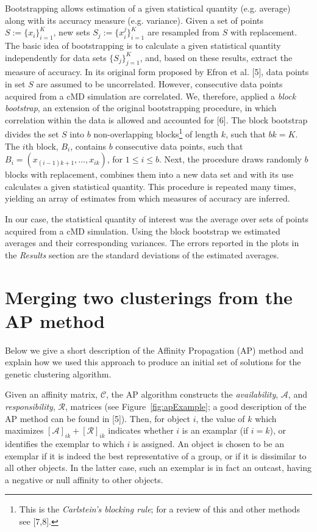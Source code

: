 \documentclass[a4paper,11pt,twoside]{book}%
\begin{document}
\begin{appendices}
Bootstrapping allows estimation of a given statistical quantity (e.g. average) along with its accuracy measure (e.g. variance).
Given a set of points \mbox{$S:=\{ x_i \}_{i=1}^K$}, new sets \mbox{$S_j:=\{ x_i^j \}_{i=1}^{K}$} are resampled from $S$ with replacement.
The basic idea of bootstrapping is to calculate a given statistical quantity independently for data sets $\{ S_j \}_{j=1}^K$, and, based on these results, extract the measure of accuracy. 
In its original form proposed by Efron et al. [5], data points in set $S$ are assumed to be uncorrelated.
However, consecutive data points acquired from a cMD simulation are correlated.
We, therefore, applied a \emph{block bootstrap}, an extension of the original bootstrapping procedure, in which correlation within the data is allowed and accounted for [6].
The block bootstrap divides the set $S$ into $b$ non-overlapping blocks\footnote{This is the \emph{Carlstein's blocking rule}; for a review of this and other methods see [7,8].} of length $k$, such that $bk=K$. 
The $i$th block, $B_i$, contains $b$ consecutive data points, such that $B_i=( x_{(i-1)k+1},\ldots,x_{ik} )$, for $1\leq i\leq b$.
Next, the procedure draws randomly $b$ blocks with replacement, combines them into a new data set and with its use calculates a given statistical quantity.
This procedure is repeated many times, yielding an array of estimates from which measures of accuracy are inferred.

In our case, the statistical quantity of interest was the average over sets of points acquired from a cMD simulation.
Using the block bootstrap we estimated averages and their corresponding variances.
The errors reported in the plots in the \emph{Results} section are the standard deviations of the estimated averages.


\section{Merging two clusterings from the AP method}\label{sec:appendixB}
Below we give a short description of the Affinity Propagation (AP) method and explain how we used this approach to produce an initial set of solutions for the genetic clustering algorithm.

Given an affinity matrix, $\mathcal{C}$, the AP algorithm constructs the \emph{availability}, $\mathcal{A}$, and \emph{responsibility}, $\mathcal{R}$, matrices (see Figure~\ref{fig:apExample}; a good description of the AP method can be found in [5]).
Then, for object $i$, the value of $k$ which maximizes $[\mathcal{A}]_{ik}+[\mathcal{R}]_{ik}$ indicates whether $i$ is an examplar (if $i=k$), or identifies the exemplar to which $i$ is assigned.
An object is chosen to be an exemplar if it is indeed the best representative of a group, or if it is dissimilar to all other objects.
In the latter case, such an exemplar is in fact an outcast, having a negative or null affinity to other objects.


\end{appendices}
\end{document}
